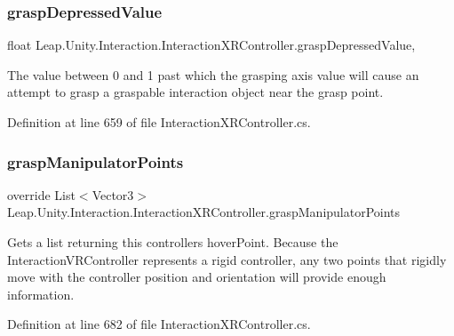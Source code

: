 \subsubsection{\texorpdfstring{graspDepressedValue}{graspDepressedValue}}
{\footnotesize\ttfamily float Leap.\+Unity.\+Interaction.\+Interaction\+X\+R\+Controller.\+grasp\+Depressed\+Value\hspace{0.3cm}{\ttfamily [get]}, {\ttfamily [set]}}



The value between 0 and 1 past which the grasping axis value will cause an attempt to grasp a graspable interaction object near the grasp point. 



Definition at line 659 of file Interaction\+X\+R\+Controller.\+cs.

\mbox{\label{class_leap_1_1_unity_1_1_interaction_1_1_interaction_x_r_controller_a521422a5de1b36220698adc1c2b3da18}} 
\subsubsection{\texorpdfstring{graspManipulatorPoints}{graspManipulatorPoints}}
{\footnotesize\ttfamily override List$<$Vector3$>$ Leap.\+Unity.\+Interaction.\+Interaction\+X\+R\+Controller.\+grasp\+Manipulator\+Points\hspace{0.3cm}{\ttfamily [get]}}



Gets a list returning this controller\textquotesingle{}s hover\+Point. Because the Interaction\+V\+R\+Controller represents a rigid controller, any two points that rigidly move with the controller position and orientation will provide enough information. 



Definition at line 682 of file Interaction\+X\+R\+Controller.\+cs.

\mbox{\label{class_leap_1_1_unity_1_1_interaction_1_1_interaction_x_r_controller_aebfaa8d5cd025180c86947dcfb5c5cd8}} 
